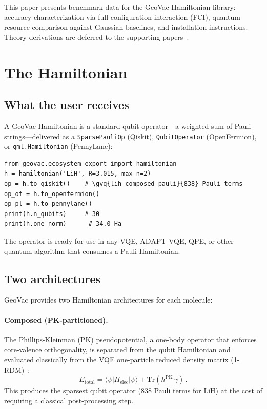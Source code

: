 \documentclass[twocolumn,pra,amsmath,amssymb,superscriptaddress]{revtex4-2}
\newcommand{\gvq}[2]{#2}
\begin{document}
This paper presents benchmark data for the GeoVac Hamiltonian library:
accuracy characterization via full configuration interaction (FCI),
quantum resource comparison against Gaussian baselines, and installation
instructions.  Theory derivations are deferred to the supporting
papers~\cite{GeoVac_Paper7,GeoVac_Paper14,GeoVac_Paper17,GeoVac_Paper19}.

\section{The Hamiltonian}
\label{sec:hamiltonian}

\subsection{What the user receives}

A GeoVac Hamiltonian is a standard qubit operator---a weighted sum of
Pauli strings---delivered as a \texttt{SparsePauliOp} (Qiskit),
\texttt{QubitOperator} (OpenFermion), or \texttt{qml.Hamiltonian}
(PennyLane):

\begin{lstlisting}
from geovac.ecosystem_export import hamiltonian
h = hamiltonian('LiH', R=3.015, max_n=2)
op = h.to_qiskit()    # \gvq{lih_composed_pauli}{838} Pauli terms
op_of = h.to_openfermion()
op_pl = h.to_pennylane()
print(h.n_qubits)     # 30
print(h.one_norm)      # 34.0 Ha
\end{lstlisting}

The operator is ready for use in any VQE, ADAPT-VQE, QPE, or other
quantum algorithm that consumes a Pauli Hamiltonian.

\subsection{Two architectures}

GeoVac provides two Hamiltonian architectures for each molecule:

\paragraph{Composed (PK-partitioned).}
The Phillips-Kleinman (PK) pseudopotential, a one-body operator that
enforces core-valence orthogonality, is separated from the qubit
Hamiltonian and evaluated classically from the VQE one-particle
reduced density matrix (1-RDM)~\cite{GeoVac_Paper17}:
\begin{equation}
  E_{\text{total}} = \langle\psi|H_{\text{elec}}|\psi\rangle
    + \mathrm{Tr}(h^{\text{PK}}\,\gamma)\,.
\end{equation}
This produces the sparsest qubit operator (\gvq{lih_composed_pauli}{838} Pauli terms for LiH)
at the cost of requiring a classical post-processing step.
\end{document}
